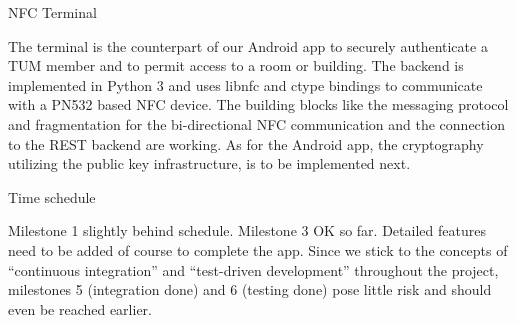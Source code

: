 NFC Terminal

The terminal is the counterpart of our Android app to securely authenticate a TUM member and to permit access to a room or building. The backend is implemented in Python 3 and uses libnfc and ctype bindings to communicate with a PN532 based NFC device. The building blocks like the messaging protocol and fragmentation for the bi-directional NFC communication and the connection to the REST backend are working. As for the Android app, the cryptography utilizing the public key infrastructure, is to be implemented next.


Time schedule

Milestone 1 slightly behind schedule.
Milestone 3 OK so far. Detailed features need to be added of course to complete the app.
Since we stick to the concepts of “continuous integration” and “test-driven development” throughout the project, milestones 5 (integration done) and 6 (testing done) pose little risk and should even be reached earlier.
